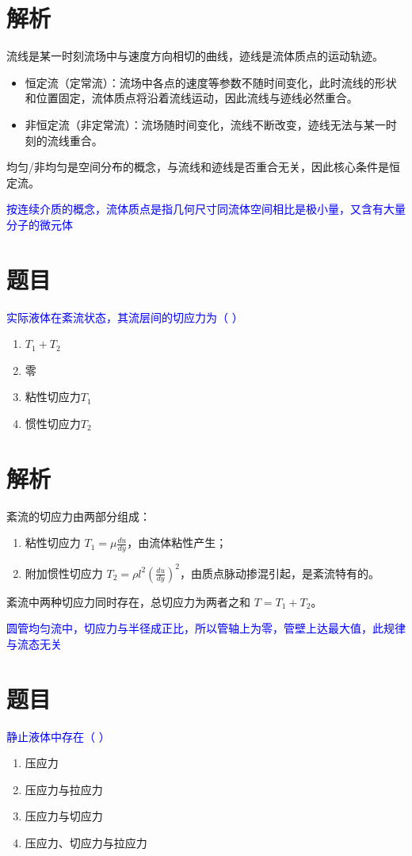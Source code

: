 \documentclass[11pt,a4paper]{article}
\begin{document}
\section*{解析}
流线是某一时刻流场中与速度方向相切的曲线，迹线是流体质点的运动轨迹。
\begin{itemize}
    \item 恒定流（定常流）：流场中各点的速度等参数不随时间变化，此时流线的形状和位置固定，流体质点将沿着流线运动，因此流线与迹线必然重合。
    \item 非恒定流（非定常流）：流场随时间变化，流线不断改变，迹线无法与某一时刻的流线重合。
\end{itemize}
均匀/非均匀是空间分布的概念，与流线和迹线是否重合无关，因此核心条件是恒定流。


\vspace{2em}
\textcolor{blue}{按连续介质的概念，流体质点是指几何尺寸同流体空间相比是极小量，又含有大量分子的微元体}


\section*{题目}
\textcolor{blue}{实际液体在紊流状态，其流层间的切应力为（ ）}
\begin{enumerate}
    \item[A] \(T_1 + T_2\)
    \item[B] 零
    \item[C] 粘性切应力\(T_1\)
    \item[D] 惯性切应力\(T_2\)
\end{enumerate}

\section*{解析}
紊流的切应力由两部分组成：
\begin{enumerate}
    \item 粘性切应力 \(T_1 = \mu \frac{du}{dy}\)，由流体粘性产生；
    \item 附加惯性切应力 \(T_2 = \rho l^2 \left( \frac{du}{dy} \right)^2\)，由质点脉动掺混引起，是紊流特有的。
\end{enumerate}
紊流中两种切应力同时存在，总切应力为两者之和 \(T = T_1 + T_2\)。

\vspace{2em}
\textcolor{blue}{圆管均匀流中，切应力与半径成正比，所以管轴上为零，管壁上达最大值，此规律与流态无关}



\section*{题目}
\textcolor{blue}{静止液体中存在（ ）}
\begin{enumerate}
    \item[A] 压应力
    \item[B] 压应力与拉应力
    \item[C] 压应力与切应力
    \item[D] 压应力、切应力与拉应力
\end{enumerate}
\end{document}
